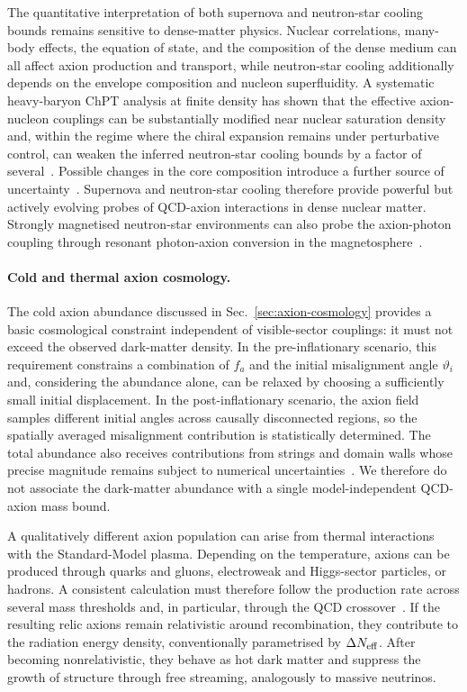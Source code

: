 \documentclass[review]{elsarticle}
\numberwithin{equation}{section}
\numberwithin{table}{section}
\numberwithin{figure}{section}
\begin{document}
The quantitative interpretation of both supernova and neutron-star cooling bounds remains sensitive to dense-matter physics. Nuclear correlations, many-body effects, the equation of state, and the composition of the dense medium can all affect axion production and transport, while neutron-star cooling additionally depends on the envelope composition and nucleon superfluidity. A systematic heavy-baryon ChPT analysis at finite density has shown that the effective axion-nucleon couplings can be substantially modified near nuclear saturation density and, within the regime where the chiral expansion remains under perturbative control, can weaken the inferred neutron-star cooling bounds by a factor of several~\cite{Springmann:2024mjp}. Possible changes in the core composition introduce a further source of uncertainty~\cite{Arias-Aragon:2026mwz}. Supernova and neutron-star cooling therefore provide powerful but actively evolving probes of QCD-axion interactions in dense nuclear matter. Strongly magnetised neutron-star environments can also probe the axion-photon coupling through resonant photon-axion conversion in the magnetosphere~\cite{Bondarenko:2022ngb}.

\paragraph{Cold and thermal axion cosmology.}

The cold axion abundance discussed in Sec.~\ref{sec:axion-cosmology} provides a basic cosmological constraint independent of visible-sector couplings: it must not exceed the observed dark-matter density. In the pre-inflationary scenario, this requirement constrains a combination of $f_a$ and the initial misalignment angle $\vartheta_i$ and, considering the abundance alone, can be relaxed by choosing a sufficiently small initial displacement. In the post-inflationary scenario, the axion field samples different initial angles across causally disconnected regions, so the spatially averaged misalignment contribution is statistically determined. The total abundance also receives contributions from strings and domain walls whose precise magnitude remains subject to numerical uncertainties~\cite{Borsanyi:2016ksw,Gorghetto:2018myk,Gorghetto:2020qws,Buschmann:2021sdq}. We therefore do not associate the dark-matter abundance with a single model-independent QCD-axion mass bound.

A qualitatively different axion population can arise from thermal interactions with the Standard-Model plasma. Depending on the temperature, axions can be produced through quarks and gluons, electroweak and Higgs-sector particles, or hadrons. A consistent calculation must therefore follow the production rate across several mass thresholds and, in particular, through the QCD crossover~\cite{DEramo:2021lgb}. If the resulting relic axions remain relativistic around recombination, they contribute to the radiation energy density, conventionally parametrised by $\Delta N_{\rm eff}$. After becoming nonrelativistic, they behave as hot dark matter and suppress the growth of structure through free streaming, analogously to massive neutrinos.
\end{document}
